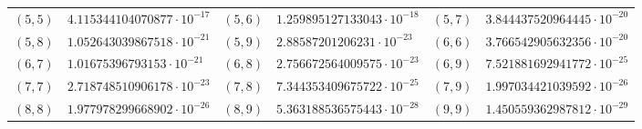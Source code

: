 {\begin{longtable}{rlrlrl}
$(5,5)$ & $4.115344104070877\cdot10^{-17}$ & $(5,6)$ & $1.259895127133043\cdot10^{-18}$ & $(5,7)$ & $3.844437520964445\cdot10^{-20}$\\
$(5,8)$ & $1.052643039867518\cdot10^{-21}$ & $(5,9)$ & $2.88587201206231\cdot10^{-23}$ & $(6,6)$ & $3.766542905632356\cdot10^{-20}$\\
$(6,7)$ & $1.01675396793153\cdot10^{-21}$ & $(6,8)$ & $2.756672564009575\cdot10^{-23}$ & $(6,9)$ & $7.521881692941772\cdot10^{-25}$\\
$(7,7)$ & $2.718748510906178\cdot10^{-23}$ & $(7,8)$ & $7.344353409675722\cdot10^{-25}$ & $(7,9)$ & $1.997034421039592\cdot10^{-26}$\\
$(8,8)$ & $1.977978299668902\cdot10^{-26}$ & $(8,9)$ & $5.363188536575443\cdot10^{-28}$ & $(9,9)$ & $1.450559362987812\cdot10^{-29}$\\
\bottomrule
\end{longtable}}
